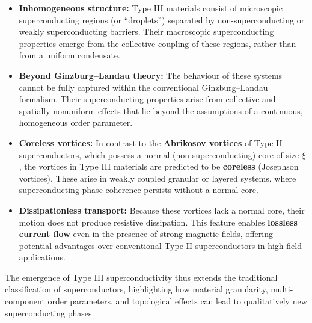\begin{itemize}
    \item \textbf{Inhomogeneous structure:} Type III materials consist of microscopic superconducting regions (or ``droplets'') separated by non-superconducting or weakly superconducting barriers.  
    Their macroscopic superconducting properties emerge from the collective coupling of these regions, rather than from a uniform condensate.
    \item \textbf{Beyond Ginzburg–Landau theory:}  
    The behaviour of these systems cannot be fully captured within the conventional Ginzburg–Landau formalism. Their superconducting properties arise from collective and spatially nonuniform effects that lie beyond the assumptions of a continuous, homogeneous order parameter.
    \item \textbf{Coreless vortices:} In contrast to the \textbf{Abrikosov vortices} of Type II superconductors, which possess a normal (non-superconducting) core of size $\xi$, the vortices in Type III materials are predicted to be \textbf{coreless} (Josephson vortices).  
    These arise in weakly coupled granular or layered systems, where superconducting phase coherence persists without a normal core.
    \item \textbf{Dissipationless transport:} Because these vortices lack a normal core, their motion does not produce resistive dissipation.  
    This feature enables \textbf{lossless current flow} even in the presence of strong magnetic fields, offering potential advantages over conventional Type II superconductors in high-field applications.
\end{itemize}

The emergence of Type III superconductivity thus extends the traditional classification of superconductors, highlighting how material granularity, multi-component order parameters, and topological effects can lead to qualitatively new superconducting phases.  
